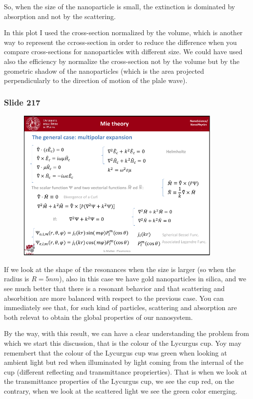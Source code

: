 \documentclass[../main/main.tex]{subfiles}
\begin{document}
So, when the size  of the nanoparticle is small, the extinction is dominated by absorption and not by the scattering.


In this plot I used the  cross-section normalized by the volume, which is another way to represent the ccross-section in order to reduce the difference when you compare cross-sections for nanoparticles with different size. We could have used also the efficiency
by normalize the cross-section not by the volume but by the geometric shadow of the nanoparticles (which is the area projected perpendicularly to the direction of motion of the plale wave).

\newpage

\subsubsection{Slide 217}

\begin{figure}[h!]
\centering
\includegraphics[page=10,width=0.9\textwidth]{../lessons/pdf_file/13_lesson.pdf}
\end{figure}

If we look at the shape of the resonances when the size is larger (so when the radius is \( R=5nm \)), also in this case we have gold nanoparticles in silica, and we see much better that there is a resonant behavior and that scattering and absorbition are more balanced with respect to the previous case. You can immediately see  that, for such kind of particles, scattering and absorption are both relevat to obtain the global properties of our nanosystem.

By the way, with this result, we can have a clear understanding the problem from which we start this discussion, that is the colour of the Lycurgus cup. Yoy may remembert that the colour of the Lycurgus cup was  green when looking at ambient light but red when illuminated by light coming from the internal of the cup (different reflecting and transmittance proprierties). That is when we look at the transmittance properties of the Lycurgus cup, we see the cup red, on the contrary, when we look at the scattered light we see the green color emerging.
\end{document}
